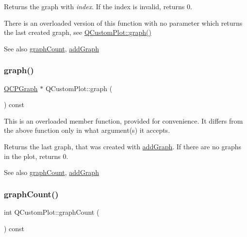 Returns the graph with {\itshape index}. If the index is invalid, returns 0.

There is an overloaded version of this function with no parameter which returns the last created graph, see \hyperlink{class_q_custom_plot_a6ecae130f684b25276fb47bd3a5875c6}{Q\+Custom\+Plot\+::graph()}

\begin{DoxySeeAlso}{See also}
\hyperlink{class_q_custom_plot_a5e1787cdde868c4d3790f9ebc8207d90}{graph\+Count}, \hyperlink{class_q_custom_plot_a6fb2873d35a8a8089842d81a70a54167}{add\+Graph} 
\end{DoxySeeAlso}
\mbox{\label{class_q_custom_plot_aac190865a67f19af3fdf2136774997af}} 
\subsubsection{\texorpdfstring{graph()}{graph()}\hspace{0.1cm}{\footnotesize\ttfamily [2/2]}}
{\footnotesize\ttfamily \hyperlink{class_q_c_p_graph}{Q\+C\+P\+Graph} $\ast$ Q\+Custom\+Plot\+::graph (\begin{DoxyParamCaption}{ }\end{DoxyParamCaption}) const}

This is an overloaded member function, provided for convenience. It differs from the above function only in what argument(s) it accepts.

Returns the last graph, that was created with \hyperlink{class_q_custom_plot_a6fb2873d35a8a8089842d81a70a54167}{add\+Graph}. If there are no graphs in the plot, returns 0.

\begin{DoxySeeAlso}{See also}
\hyperlink{class_q_custom_plot_a5e1787cdde868c4d3790f9ebc8207d90}{graph\+Count}, \hyperlink{class_q_custom_plot_a6fb2873d35a8a8089842d81a70a54167}{add\+Graph} 
\end{DoxySeeAlso}
\mbox{\label{class_q_custom_plot_a5e1787cdde868c4d3790f9ebc8207d90}} 
\subsubsection{\texorpdfstring{graph\+Count()}{graphCount()}}
{\footnotesize\ttfamily int Q\+Custom\+Plot\+::graph\+Count (\begin{DoxyParamCaption}{ }\end{DoxyParamCaption}) const}

